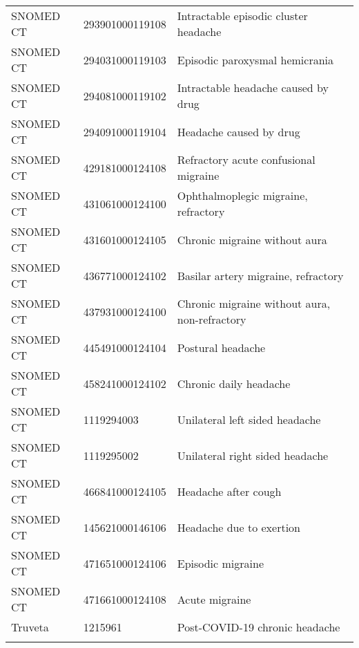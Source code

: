 \begin{longtable}{p{}p{}p{}}
  SNOMED CT & 293901000119108 & Intractable episodic cluster headache \\ 
  SNOMED CT & 294031000119103 & Episodic paroxysmal hemicrania \\ 
  SNOMED CT & 294081000119102 & Intractable headache caused by drug \\ 
  SNOMED CT & 294091000119104 & Headache caused by drug \\ 
  SNOMED CT & 429181000124108 & Refractory acute confusional migraine \\ 
  SNOMED CT & 431061000124100 & Ophthalmoplegic migraine, refractory \\ 
  SNOMED CT & 431601000124105 & Chronic migraine without aura \\ 
  SNOMED CT & 436771000124102 & Basilar artery migraine, refractory \\ 
  SNOMED CT & 437931000124100 & Chronic migraine without aura, non-refractory \\ 
  SNOMED CT & 445491000124104 & Postural headache \\ 
  SNOMED CT & 458241000124102 & Chronic daily headache \\ 
  SNOMED CT & 1119294003 & Unilateral left sided headache \\ 
  SNOMED CT & 1119295002 & Unilateral right sided headache \\ 
  SNOMED CT & 466841000124105 & Headache after cough \\ 
  SNOMED CT & 145621000146106 & Headache due to exertion \\ 
  SNOMED CT & 471651000124106 & Episodic migraine \\ 
  SNOMED CT & 471661000124108 & Acute migraine \\ 
  Truveta & 1215961 & Post-COVID-19 chronic headache \\ 
  \hline
\label{tab:codes_headache}
\end{longtable}
